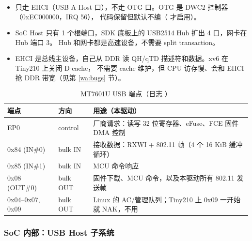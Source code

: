 \begin{itemize}[leftmargin=2em]
\item 只走 EHCI（USB-A Host 口），不走 OTG 口。OTG 是 DWC2 控制器（0xEC000000，IRQ 56），
  代码保留但默认不编（ 才启用）。
\item SoC Host 只有 1 个根端口，SDK 底板上的 USB2514 Hub 扩出 4 口，网卡在 Hub 端口 3。
  Hub 和网卡都是高速设备，不需要 split transaction。
\item EHCI 是总线主设备，自己从 DDR 读 QH/qTD 描述符和数据。xv6 在 Tiny210 上关闭 D-cache，
  不需要 cache 维护，但 CPU 访存慢、会和 EHCI 抢 DDR 带宽（见第 \ref{wa:bugs} 节）。
\end{itemize}

\begin{table}[H]\centering\small
\begin{tabular}{lll}
\toprule
端点 & 方向 & 用途（本驱动） \\ \midrule
EP0 & control & 厂商请求：读写 32 位寄存器、eFuse、FCE 固件 DMA 控制 \\
0x84 (IN\#0) & bulk IN & 接收数据：RXWI + 802.11 帧（4 个 16 KiB 缓冲循环） \\
0x85 (IN\#1) & bulk IN & MCU 命令响应 \\
0x08 (OUT\#0) & bulk OUT & 固件下载、MCU 命令，以及本驱动所有 802.11 发送帧 \\
0x04--0x07, 0x09 & bulk OUT & Linux 的 AC/管理队列；Tiny210 上 0x09 一开始就 NAK，不用 \\
\bottomrule
\end{tabular}
\caption{MT7601U USB 端点（日志 ）}
\end{table}

\subsubsection{SoC 内部：USB Host 子系统}

